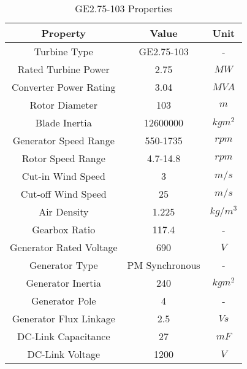 \begin{table}[h!]
	
	\centering
	\begin{tabular}{ccc}
		\hline
		\textbf{Property}       & \textbf{Value} & \textbf{Unit} \\ \hline
		Turbine Type            & GE2.75-103     & -             \\
		Rated Turbine Power     & 2.75           & $MW$          \\
		Converter Power Rating  & 3.04           & $MVA$         \\
		Rotor Diameter          & 103            & $m$           \\
		Blade Inertia           & 12600000       & $kgm^{2}$     \\
		Generator Speed Range   & 550-1735       & $rpm$         \\
		Rotor Speed Range       & 4.7-14.8       & $rpm$         \\
		Cut-in Wind Speed       & 3              & $m/s$         \\
		Cut-off Wind Speed      & 25             & $m/s$         \\
		Air Density             & 1.225          & $kg/m^{3}$    \\
		Gearbox Ratio           & 117.4          & -             \\
		Generator Rated Voltage & 690            & $V$           \\
		Generator Type          & PM Synchronous & -             \\
		Generator Inertia       & 240            & $kgm^{2}$     \\
		Generator Pole          & 4              & -             \\
		Generator Flux Linkage  & 2.5            & $Vs$          \\
		DC-Link Capacitance     & 27             & $mF$          \\
		DC-Link Voltage         & 1200           & $V$           \\ \hline
	\end{tabular}
	\caption{GE2.75-103 Properties}
	\label{ge275}
\end{table}

